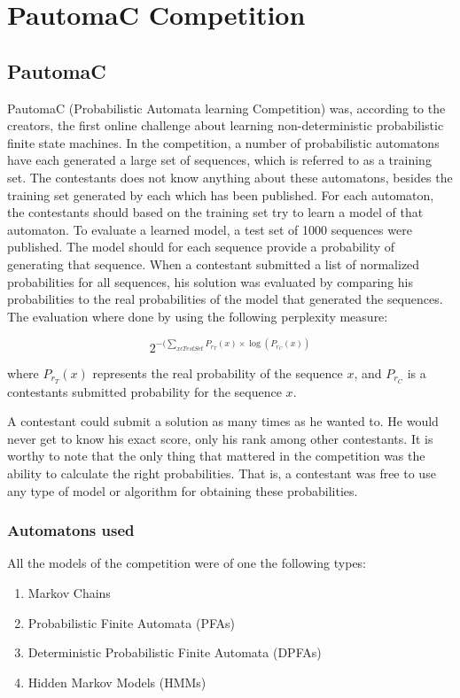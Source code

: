 \section{PautomaC Competition}

\subsection{PautomaC}
PautomaC (Probabilistic Automata learning Competition) was, according to the creators, the first online challenge about learning non-deterministic probabilistic finite state machines.
In the competition, a number of probabilistic automatons have each generated a large set of sequences, which is referred to as a training set.
The contestants does not know anything about these automatons, besides the training set generated by each which has been published.
For each automaton, the contestants should based on the training set try to learn a model of that automaton.
To evaluate a learned model, a test set of 1000 sequences were published. The model should for each sequence provide a probability of generating that sequence. When a contestant submitted a list of normalized probabilities for all sequences, his solution was evaluated by comparing his probabilities to the real probabilities of the model that generated the sequences.
The evaluation where done by using the following perplexity measure:

\begin{equation} \label{eq:perplexity}
2^{-(\sum_{x\epsilon TestSet}P_{r_{T}}(x)\times\log(P_{r_{C}}(x))}
\end{equation}

where $P_{r_{T}}(x)$ represents the real probability of the
sequence $x$, and $P_{r_{C}}$ is a contestants submitted probability for the sequence $x$.

A contestant could submit a solution as many times as he wanted to. He would never get to know his exact score, only his rank among other contestants.
It is worthy to note that the only thing that mattered in the competition was the ability to calculate the right probabilities.
That is, a contestant was free to use any type of model or algorithm for obtaining these probabilities.

\subsubsection{Automatons used}

All the models of the competition were of one the following types:
\begin{enumerate}
\item Markov Chains
\item Probabilistic Finite Automata (PFAs)
\item Deterministic Probabilistic Finite Automata (DPFAs)
\item Hidden Markov Models (HMMs)
\end{enumerate}

